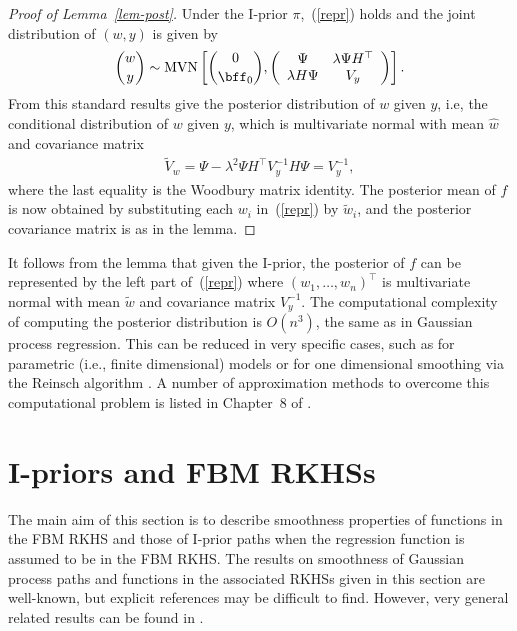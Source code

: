 \documentclass[preprint,12pt,authoryear]{elsarticle}
\DeclareMathOperator{\MVN}{MVN}
\begin{document}

\noindent\begin{proof}[Proof of Lemma~\ref{lem-post}]
	Under the I-prior $\pi$,~(\ref{repr}) holds and the joint distribution of $(w,y)$ is given by
	\[
	\binom{w}{y} \sim \MVN\left[\binom{0}{\bff_0} ,\left(\begin{array}{cc}\Psi & \lambda\Psi H ^\top \\ \lambda H\Psi & V_y\end{array}\right) \right].
	\]
	From this standard results give the posterior distribution of $w$ given $y$, i.e, the conditional distribution of $w$ given $y$, which is multivariate normal with mean $\hat w$
	and covariance matrix
	\begin{eqnarray}\label{tildew}
	\tilde V_w = \Psi - \lambda^2\Psi H ^\top V_y^{-1}H \Psi = V_y^{-1} ,
	\end{eqnarray}
	where the last equality is the Woodbury matrix identity.
	The posterior mean of $f$ is now obtained by substituting each $w_i$ in~(\ref{repr}) by $\tilde w_i$, and the posterior covariance matrix is as in the lemma.
\end{proof}


It follows from the lemma that given the I-prior, the posterior of $f$ can be represented by the left part of~(\ref{repr}) where $(w_1,\ldots,w_n)^\top$ is multivariate normal with mean $\tilde w$ and covariance matrix $V_y^{-1}$.
The computational complexity of computing the posterior distribution is $O(n^3)$, the same as in Gaussian process regression.
This can be reduced in very specific cases, such as for parametric (i.e., finite dimensional) models or for one dimensional smoothing via the Reinsch algorithm \cite[Section~2.3.3]{gs94}.
A number of approximation methods to overcome this computational problem is listed in Chapter~8 of \citet{rw06}.









\section{I-priors and FBM RKHSs}\label{sec-fbm}

The main aim of this section is to describe smoothness properties of functions in the FBM RKHS and those of I-prior paths when the regression function is assumed to be in the FBM RKHS. 
The results on smoothness of Gaussian process paths and functions in the associated RKHSs given in this section are well-known, but explicit references may be difficult to find. However, very general related results can be found in \citet{steinwart18}.
\end{document}
